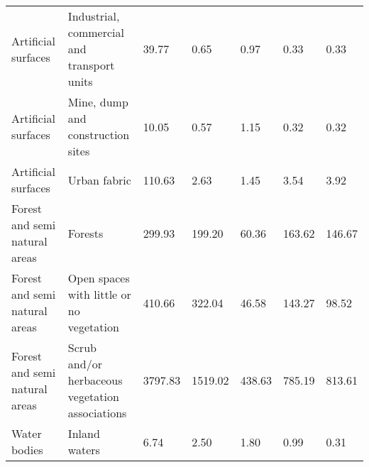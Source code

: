 \begin{table}[]
{\begin{tabular}{lllllll}
Artificial surfaces           & Industrial, commercial and transport units      & 39.77            & 0.65                                                       & 0.97                                                     & 0.33                                                     & 0.33            \\
Artificial surfaces           & Mine, dump and construction sites               & 10.05            & 0.57                                                       & 1.15                                                     & 0.32                                                     & 0.32            \\
Artificial surfaces           & Urban fabric                                    & 110.63           & 2.63                                                       & 1.45                                                     & 3.54                                                     & 3.92            \\
Forest and semi natural areas & Forests                                         & 299.93           & 199.20                                                     & 60.36                                                    & 163.62                                                   & 146.67          \\
Forest and semi natural areas & Open spaces with little or no vegetation        & 410.66           & 322.04                                                     & 46.58                                                    & 143.27                                                   & 98.52           \\
Forest and semi natural areas & Scrub and/or herbaceous vegetation associations & 3797.83          & 1519.02                                                    & 438.63                                                   & 785.19                                                   & 813.61          \\
Water bodies                  & Inland waters                                   & 6.74             & 2.50                                                       & 1.80                                                     & 0.99                                                     & 0.31           
\end{tabular}%
}
\label{table:arthropods-tableS3}
\end{table}


